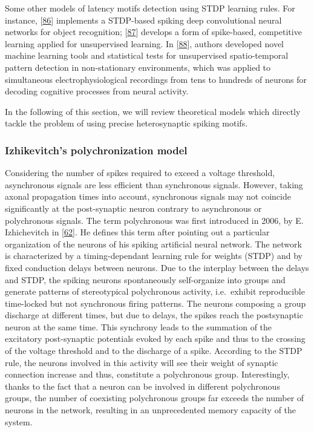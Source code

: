 Some other models of latency motifs detection using STDP learning rules. For instance, {[}\protect\hyperlink{ref-Dd3kSDRW}{86}{]} implements a STDP-based spiking deep convolutional neural networks for object recognition; {[}\protect\hyperlink{ref-vePjgmRh}{87}{]} develops a form of spike-based, competitive learning applied for unsupervised learning. In {[}\protect\hyperlink{ref-RrgzWOSk}{88}{]}, authors developed novel machine learning tools and statistical tests for unsupervised spatio-temporal pattern detection in non-stationary environments, which was applied to simultaneous electrophysiological recordings from tens to hundreds of neurons for decoding cognitive processes from neural activity.

In the following of this section, we will review theoretical models which directly tackle the problem of using precise heterosynaptic spiking motifs.

\hypertarget{izhikevitchs-polychronization-model}{%
\subsubsection{Izhikevitch's polychronization model}\label{izhikevitchs-polychronization-model}}

Considering the number of spikes required to exceed a voltage threshold, asynchronous signals are less efficient than synchronous signals. However, taking axonal propagation times into account, synchronous signals may not coincide significantly at the post-synaptic neuron contrary to asynchronous or polychronous signals. The term polychronous was first introduced in 2006, by E. Izhichevitch in {[}\protect\hyperlink{ref-SM9G0xBK}{62}{]}. He defines this term after pointing out a particular organization of the neurons of his spiking artificial neural network. The network is characterized by a timing-dependant learning rule for weights (STDP) and by fixed conduction delays between neurons. Due to the interplay between the delays and STDP, the spiking neurons spontaneously self-organize into groups and generate patterns of stereotypical polychronous activity, i.e.~exhibit reproducible time-locked but not synchronous firing patterns. The neurons composing a group discharge at different times, but due to delays, the spikes reach the postsynaptic neuron at the same time. This synchrony leads to the summation of the excitatory post-synaptic potentials evoked by each spike and thus to the crossing of the voltage threshold and to the discharge of a spike. According to the STDP rule, the neurons involved in this activity will see their weight of synaptic connection increase and thus, constitute a polychronous group. Interestingly, thanks to the fact that a neuron can be involved in different polychronous groups, the number of coexisting polychronous groups far exceeds the number of neurons in the network, resulting in an unprecedented memory capacity of the system.

